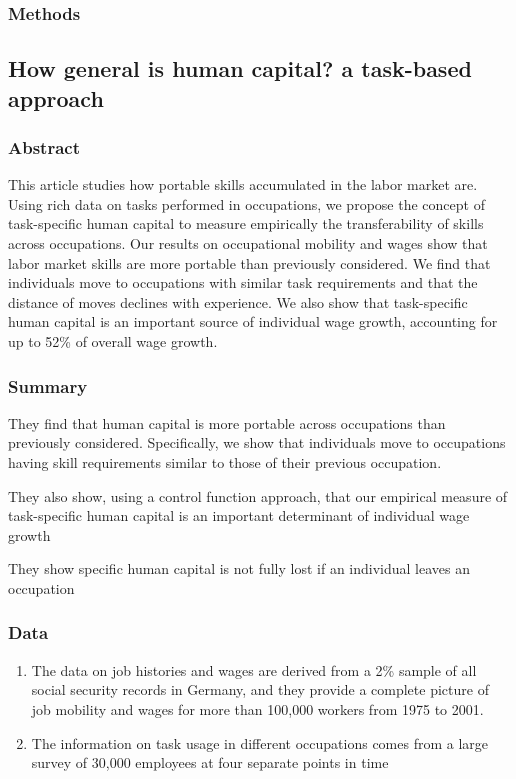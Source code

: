 \documentclass[12pt]{article}
\begin{document}
\subsubsection*{Methods}


\subsection*{How general is human capital? a task-based approach\cite{how_general_is_human_capital}}

\subsubsection*{Abstract}
This article studies how portable skills accumulated in the labor market are. Using rich data on tasks performed in occupations, we propose the concept of task-specific human capital to measure empirically the transferability of skills across occupations. Our results on occupational mobility and wages show that labor market skills are more portable than previously considered. We find that individuals move to occupations with similar task requirements and that the distance of moves declines with experience. We also show that task-specific human capital is an important source of individual wage growth, accounting for up to 52\% of overall wage growth.
\subsubsection*{Summary}

They find that human capital is more portable across occupations than previously considered. Specifically, we show that individuals move to occupations having skill requirements similar to those of their previous occupation.  

They also show, using a control function approach, that our empirical measure of task-specific human capital is an important determinant of individual wage growth

They show specific human capital is not fully lost if an individual leaves an occupation
\subsubsection*{Data}
\begin{enumerate}
    \item The data on job histories and wages are derived from a 2\% sample of all social security records in Germany, and they provide a complete picture of job mobility and wages for more than 100,000 workers from 1975 to 2001.
    \item The information on task usage in different occupations comes from a large survey of 30,000 employees at four separate points in time
\end{enumerate}
\end{document}
